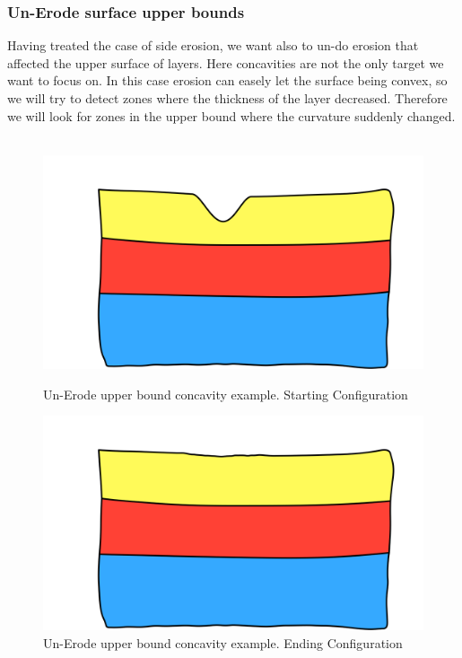 \documentclass[12pt, a4paper]{report} %
\begin{document}
\subsubsection{Un-Erode surface upper bounds}
\label{sub:convavepart}
Having treated the case of side erosion, we want also to un-do erosion that affected the upper surface of layers. Here concavities are not the only target we want to focus on. In this case erosion can easely let the surface being convex, so we will try to detect zones where the thickness of the layer decreased. Therefore we will look for zones in the upper bound where the curvature suddenly changed.\\\\
\begin{figure}[H]
    \begin{minipage}[c]{.46\linewidth}
        \centering
        \includegraphics[scale=0.2]{unErodeUpDescription0.png}
	\caption{Un-Erode upper bound concavity example. Starting Configuration}
    \end{minipage}
    \hfill%
    \begin{minipage}[c]{.46\linewidth}
        \centering
        \includegraphics[scale=0.2]{unErodeUpDescription1.png}
	\caption{Un-Erode upper bound concavity example. Ending Configuration}
    \end{minipage}
\end{figure}\\
\end{document}
